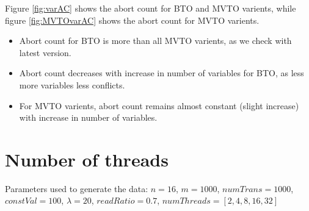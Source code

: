 \documentclass[12pt]{article}
\begin{document}
Figure \ref{fig:varAC} shows the abort count for BTO and MVTO varients, while figure \ref{fig:MVTOvarAC} shows the abort count for MVTO varients.
\begin{itemize}
    \item Abort count for BTO is more than all MVTO varients, as we check with latest version.
    \item Abort count decreases with increase in number of variables for BTO, as less more variables less conflicts.
    \item For MVTO varients, abort count remains almost constant (slight increase) with increase in number of variables.
\end{itemize}

\section*{Number of threads}
Parameters used to generate the data:
$n=16$, $m=1000$, $numTrans=1000$, $constVal=100$, $\lambda=20$, $readRatio=0.7$, $numThreads = [2, 4, 8, 16, 32]$
\end{document}
